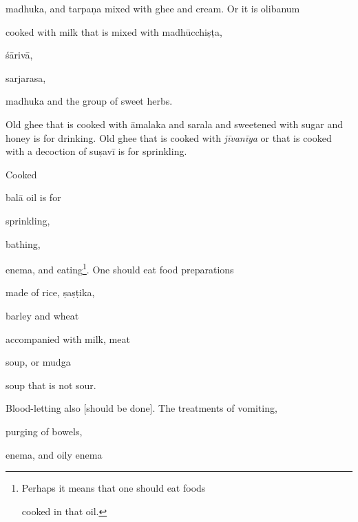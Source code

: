 \begin{translation}
\begin{tt}
        \gls{madhuka},
        and
        \gls{tarpaṇa}
        mixed
        with
        ghee
        and
        cream.
        Or it is
        olibanum

        cooked with
        milk
        that is
        mixed
        with
        \gls{madhūcchiṣṭa},

        \gls{śārivā},

        \gls{sarjarasa},

        \gls{madhuka}
        and
        the
        group
        of
        sweet
        herbs.

        Old
        ghee
        that
        is
        cooked
        with
        \gls{āmalaka}
        and
        \gls{sarala}
        and
        sweetened
        with
        sugar
        and
        honey
        is
        for
        drinking.
        Old
        ghee
        that
        is
        cooked
        with
        \textit{jīvanīya}
        or
        that
        is
        cooked
        with
        a
        decoction
        of
        \gls{suṣavī}
        is
        for
        sprinkling.

        Cooked

        \gls{balā}
        oil
        is for

        sprinkling,

        bathing,

        enema,
        and
        eating\footnote{Perhaps
            it
            means
            that
            one
            should
            eat
            foods

            cooked
            in
            that
            oil.}.
        One
        should
        eat
        food
        preparations

        made
        of
        rice,
        \gls{ṣaṣṭika},

        barley
        and
        wheat

        accompanied
        with
        milk,
        meat

        soup,
        or
        \gls{mudga}

        soup that
        is
        not
        sour.

        Blood-letting
        also
            [should
                be
                done].
        The
        treatments
        of
        vomiting,

        purging
        of
        bowels,

        enema,
        and
        oily
        enema


\end{tt}
\end{translation}

